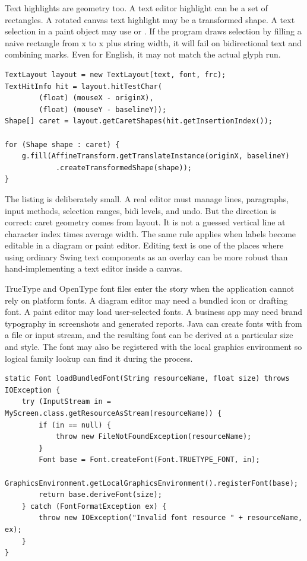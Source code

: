Text highlights are geometry too. A text editor highlight can be a set of rectangles. A rotated canvas text highlight may be a transformed shape. A text selection in a paint object may use  or . If the program draws selection by filling a naive rectangle from x to x plus string width, it will fail on bidirectional text and combining marks. Even for English, it may not match the actual glyph run.

\begin{lstlisting}[caption={Using TextLayout for hit testing and caret geometry.}]
TextLayout layout = new TextLayout(text, font, frc);
TextHitInfo hit = layout.hitTestChar(
        (float) (mouseX - originX),
        (float) (mouseY - baselineY));
Shape[] caret = layout.getCaretShapes(hit.getInsertionIndex());

for (Shape shape : caret) {
    g.fill(AffineTransform.getTranslateInstance(originX, baselineY)
            .createTransformedShape(shape));
}
\end{lstlisting}

The listing is deliberately small. A real editor must manage lines, paragraphs, input methods, selection ranges, bidi levels, and undo. But the direction is correct: caret geometry comes from layout. It is not a guessed vertical line at character index times average width. The same rule applies when labels become editable in a diagram or paint editor. Editing text is one of the places where using ordinary Swing text components as an overlay can be more robust than hand-implementing a text editor inside a canvas.

TrueType and OpenType font files enter the story when the application cannot rely on platform fonts. A diagram editor may need a bundled icon or drafting font. A paint editor may load user-selected fonts. A business app may need brand typography in screenshots and generated reports. Java can create fonts with  from a file or input stream, and the resulting font can be derived at a particular size and style. The font may also be registered with the local graphics environment so logical family lookup can find it during the process.

\begin{lstlisting}[caption={Loading a bundled TrueType font resource deliberately.}]
static Font loadBundledFont(String resourceName, float size) throws IOException {
    try (InputStream in = MyScreen.class.getResourceAsStream(resourceName)) {
        if (in == null) {
            throw new FileNotFoundException(resourceName);
        }
        Font base = Font.createFont(Font.TRUETYPE_FONT, in);
        GraphicsEnvironment.getLocalGraphicsEnvironment().registerFont(base);
        return base.deriveFont(size);
    } catch (FontFormatException ex) {
        throw new IOException("Invalid font resource " + resourceName, ex);
    }
}
\end{lstlisting}

